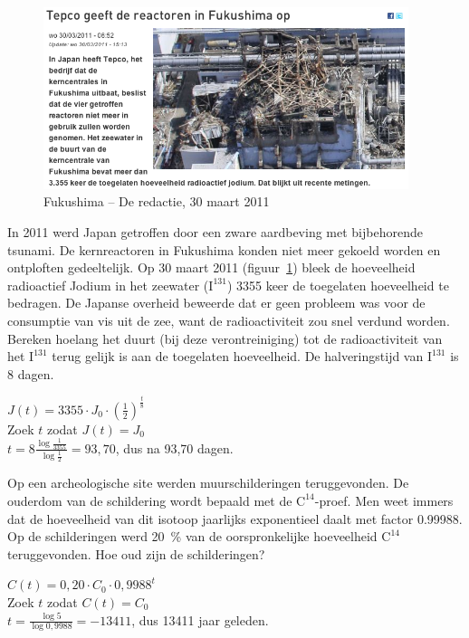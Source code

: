  
  \begin{figure}[hbtp]
      \flushright
\includegraphics[width=0.95\textwidth]{oefeningen/jodiumderedactie.png}
\caption{Fukushima -- De redactie, 30 maart 2011}
\label{fig:fukushima} 
\end{figure}    
\begin{oef}
In 2011 werd Japan getroffen door een zware aardbeving met bijbehorende tsunami. De kernreactoren in Fukushima konden niet meer gekoeld worden en ontploften gedeeltelijk. Op 30 maart 2011 (figuur~\ref{fig:fukushima}) bleek de hoeveelheid radioactief Jodium in het zeewater ($\text{I}^{131}$) 3355 keer de toegelaten hoeveelheid te bedragen. 
De Japanse overheid beweerde dat er geen probleem was voor de consumptie van vis uit de zee, want de radioactiviteit zou snel verdund worden. Bereken hoelang het duurt (bij deze verontreiniging) tot de radioactiviteit van het $\text{I}^{131}$ terug gelijk is aan de toegelaten hoeveelheid. De halveringstijd van $\text{I}^{131}$ is 8 dagen.
      \begin{opl}
      $J(t)=3355\cdot J_0\cdot \left( \frac12\right)^\frac{t}{8}$\\
      Zoek $t$ zodat $J(t)=J_0$\\
      $t=8\frac{\log \frac{1}{3355}}{\log\frac12}=93,70$, dus na 93,70 dagen.
      \end{opl}
      \end{oef}


\begin{oef}
 Op een archeologische site werden muurschilderingen
    teruggevonden. De ouderdom van de schildering wordt bepaald
    met de $\text{C}^{14}$-proef.  Men weet immers  dat de
    hoeveelheid van dit isotoop jaarlijks exponentieel daalt met factor
    \num{0.99988}. Op de schilderingen werd \SI{20}{\percent} van de
    oorspronkelijke hoeveelheid $\text{C}^{14}$ teruggevonden. Hoe oud
    zijn de schilderingen?
    \begin{opl}
    $C(t)=0,20\cdot C_0\cdot 0,9988^t$\\
    Zoek $t$ zodat $C(t)=C_0$\\
    $t=\frac{\log5}{\log0,9988}=-13411$, dus 13411 jaar geleden.
    \end{opl}
       \end{oef}

